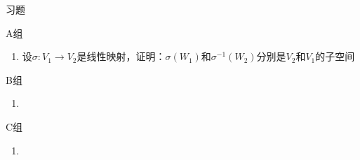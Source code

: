 \centerline{\heiti \Large 习题}
\vspace{2ex}
{\kaishu }
\begin{flushright}
    \kaishu

\end{flushright}
\centerline{\heiti A组}
\begin{enumerate}
    \item 设$\sigma: V_1\to V_2$是线性映射，证明：$\sigma(W_1)$和$\sigma^{-1}(W_2)$分别是$V_2$和$V_1$的子空间
\end{enumerate}
\centerline{\heiti B组}
\begin{enumerate}
    \item
\end{enumerate}
\centerline{\heiti C组}
\begin{enumerate}
    \item
\end{enumerate}
